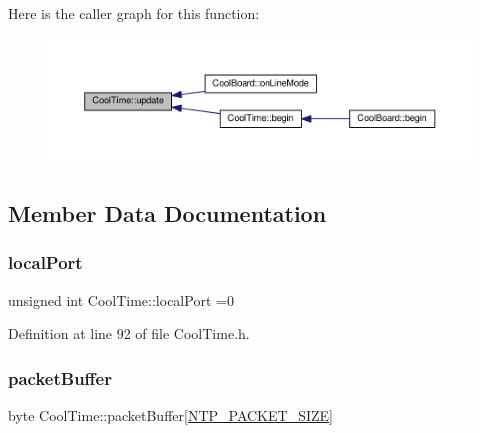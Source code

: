 Here is the caller graph for this function\+:\nopagebreak
\begin{figure}[H]
\begin{center}
\leavevmode
\includegraphics[width=350pt]{d6/d49/class_cool_time_aae601f795452cfa48d9fb337aed483a8_icgraph}
\end{center}
\end{figure}


\subsection{Member Data Documentation}
\mbox{\label{class_cool_time_a2f777da44d7ba678be8185299e9b49d1}} 
\subsubsection{\texorpdfstring{local\+Port}{localPort}}
{\footnotesize\ttfamily unsigned int Cool\+Time\+::local\+Port =0\hspace{0.3cm}{\ttfamily [private]}}



Definition at line 92 of file Cool\+Time.\+h.

\mbox{\label{class_cool_time_a27e6abc82a5c2f72161956967005bec7}} 
\subsubsection{\texorpdfstring{packet\+Buffer}{packetBuffer}}
{\footnotesize\ttfamily byte Cool\+Time\+::packet\+Buffer\mbox{[}\hyperlink{_cool_time_8h_a56a6ea64006651b4f42adf713e244f06}{N\+T\+P\+\_\+\+P\+A\+C\+K\+E\+T\+\_\+\+S\+I\+ZE}\mbox{]}\hspace{0.3cm}{\ttfamily [private]}}



